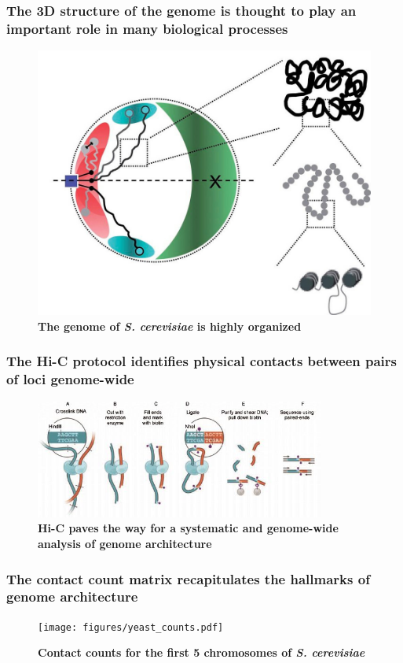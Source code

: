 \documentclass[xcolor=dvipsnames]{beamer}
\begin{document}
\begin{frame}
\frametitle{The 3D structure of the genome is thought to play an important
role in many biological processes}
\vspace{-0.6em}
\begin{figure}
\begin{center}
\includegraphics[width=0.7\linewidth]{figures/yeasts_genome_architecture.jpg}
\end{center}
\caption{\textbf{The genome of \textit{S. cerevisiae} is highly organized}
         \citep{zimmer:principles}}
\end{figure}
\end{frame}

\begin{frame}
\frametitle{The Hi-C protocol identifies physical contacts between
pairs of loci genome-wide}
\begin{figure}
\centering
\includegraphics[width=0.85\textwidth]{figures/hic_protocol.jpg}
\caption{\textbf{Hi-C paves the way for a systematic and genome-wide analysis
of genome architecture} \citep{rao:3d}}
\end{figure}
\end{frame}

\begin{frame}
\frametitle{The contact count matrix recapitulates the hallmarks of genome
architecture}
\vspace{-1em}
\begin{figure}
\texttt{[image: figures/yeast\_counts.pdf]}
\caption{\textbf{Contact counts for the first 5 chromosomes of \textit{S.
cerevisiae}}}
\end{figure}
\end{frame}
\end{document}
